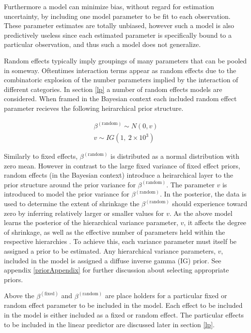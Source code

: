 \documentclass[12pt]{article}
\begin{document}
%
Furthermore a model can minimize bias, without regard for estimation 
uncertainty, by including one model parameter to be fit to each observation. 
These parameter estimates are totally unbiased, however such a model is also 
predictively useless since each estimated parameter is specifically bound to 
a particular observation, and thus such a model does not generalize. 

%
Random effects typically imply groupings of many parameters that can be 
pooled in someway. Oftentimes interaction terms appear as random effects due 
to the combinatoric explosion of the number parameters implied by the 
interaction of different categories. In section \ref{lp} a number of random 
effects models are considered. When framed in the Bayesian context each 
included random effect parameter recieves the following heirarchical prior 
structure.  

%
\begin{align}
\beta^{(\text{random})} \sim N(0, v)\\
v \sim IG(1,~2\times10^{3})
\end{align}

%
Similarly to fixed effects, $\beta^{(\text{random})}$ is distributed as a 
normal distribution with zero mean. However in contrast to the large 
fixed variance of fixed effect priors, random effects (in the Bayesian 
context) introduce a heirarchical layer to the prior structure around the prior 
variance for $\beta^{(\text{random})}$. The parameter $v$ is 
introduced to model the prior variance for $\beta^{(\text{random})}$. In the 
posterior, the data is used to determine the extent of shrinkage the 
$\beta^{(\text{random})}$ should experience toward zero by inferring 
relatively larger or smaller values for $v$. As the above model learns the 
posterior of the hierarchical variance parameter, $v$, it affects 
the degree of shrinkage, as well as the effective number of parameters held 
within the respective hierarchies \cite{gelman_bayesian_2013}. To achieve this, each 
variance parameter must itself be assigned a prior to be estimated. Any 
hierarchical variance parameters, $v$, included in the model is 
assigned a {\color{red} diffuse inverse gamma (IG) prior. See {\color{red} appendix 
\ref{priorAppendix}} for further discussion about selecting appropriate priors.}

%
Above the $\beta^{(\text{fixed})}$ and $\beta^{(\text{random})}$ are place 
holders for a particular fixed or random effect parameter to be included in the 
model. Each effect to be included in the model is either included as a fixed 
or random effect. The particular effects to be included in the linear 
predictor are discussed later in section \ref{lp}.
\end{document}
